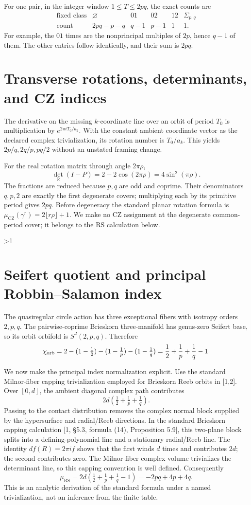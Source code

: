 \documentclass[10pt]{article}
\newcommand{\CZ}{\mathrm{CZ}}
\newcommand{\RS}{\mathrm{RS}}
\begin{document}
For one pair, in the integer window $1\leq T\leq2pq$, the exact counts are
\[
\begin{array}{c|ccccc}
\text{fixed class}&\varnothing&01&02&12&\Sigma_{p,q}\\ \hline
\text{count}&2pq-p-q&q-1&p-1&1&1.
\end{array}
\]
For example, the $01$ times are the nonprincipal multiples of $2p$, hence
$q-1$ of them.  The other entries follow identically, and their sum is $2pq$.

\section{Transverse rotations, determinants, and CZ indices}
The derivative on the missing $k$-coordinate line over an orbit of period
$T_0$ is multiplication by $e^{2\pi iT_0/a_k}$.  With the constant ambient
coordinate vector as the declared complex trivialization, its rotation number
is $T_0/a_k$.  This yields $2p/q,2q/p,pq/2$ without an unstated framing change.

For the real rotation matrix through angle $2\pi\rho$,
\[
 \det_{\mathbb R}(I-P)=2-2\cos(2\pi\rho)=4\sin^2(\pi\rho).
\]
The fractions are reduced because $p,q$ are odd and coprime.  Their
denominators $q,p,2$ are exactly the first degenerate covers; multiplying each
by its primitive period gives $2pq$.  Before degeneracy the standard planar
rotation formula is
$\mu_{\CZ}(\gamma^r)=2\lfloor r\rho\rfloor+1$.  We make no CZ assignment at
the degenerate common-period cover; it belongs to the RS calculation below.
\fi

\ifnum\CRevisionRound>1
\section{Seifert quotient and principal Robbin--Salamon index}
The quasiregular circle action has three exceptional fibers with isotropy
orders $2,p,q$.  The pairwise-coprime Brieskorn three-manifold has genus-zero
Seifert base, so its orbit orbifold is $S^2(2,p,q)$.  Therefore
\[
 \chi_{\rm orb}=2-(1-\tfrac12)
 -(1-\tfrac1p)-(1-\tfrac1q)
 =\frac12+\frac1p+\frac1q-1.
\]

We now make the principal index normalization explicit.  Use the standard
Milnor-fiber capping trivialization employed for Brieskorn Reeb orbits in
[1,2].  Over $[0,d]$, the ambient diagonal complex path contributes
\[
 2d(\tfrac12+\tfrac1p+\tfrac1q).
\]
Passing to the contact distribution removes the complex normal block supplied
by the hypersurface and radial/Reeb directions.  In the standard Brieskorn
capping calculation [1, \S5.3, formula (14), Proposition 5.9],
this two-plane block splits into a defining-polynomial line and a stationary
radial/Reeb line.  The identity $df(R)=2\pi if$ shows that the first winds
$d$ times and contributes $2d$; the second contributes zero.  The
Milnor-fiber complex volume trivializes the determinant line, so this capping
convention is well defined.  Consequently
\[
 \mu_{\RS}=2d(\tfrac12+\tfrac1p+\tfrac1q-1)
 =-2pq+4p+4q.
\]
This is an analytic derivation of the standard formula under a named
trivialization, not an inference from the finite table.
\end{document}
